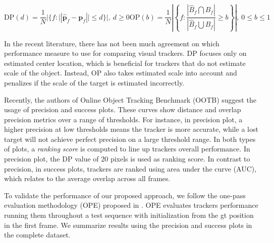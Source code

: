 \begin{subequations}
\begin{equation}
	\mathrm{DP}(d) = \frac{1}{N}|\{f:||\mathbf{\hat{p}}_f - \mathbf{p}_f|| \leq d\}|,\:d\geq 0
\label{eq::precision}
\end{equation}

\begin{equation}
	\mathrm{OP}(b) = \frac{1}{N}\left | \left \{ f: \frac{|\hat{B}_f \bigcap B_f|}
										{|\hat{B}_f \bigcup  B_f|}
	 \geq b \right \} \right |,\:0 \leq b\leq 1
\label{eq::overlap}
\end{equation}
\end{subequations}

In the recent literature, there has not been much agreement on which
performance measure to use for comparing visual trackers. DP focuses only
on estimated center location, which is beneficial for trackers that do not
estimate scale of the object. Instead, OP also takes estimated scale into
account and penalizes if the scale of the target is estimated incorrectly.

Recently, the authors of Online Object Tracking Benchmark (OOTB) \cite{Wu2013B} suggest the usage
of precision and success plots. These curves show distance and \gls{overlap} precision metrics over a range of
thresholds. For instance, in precision plot, a higher precision at low
thresholds means the tracker is more accurate, while a lost target will not
achieve perfect precision on a large threshold range. In both types of plots,
a \textit{ranking score} is computed to line up trackers overall performance.
In precision plot, the DP value of 20 pixels is used as ranking score. In contrast to precision, in success plots, trackers are ranked using area under
the curve (AUC), which relates to the average overlap across all frames. 

To validate the performance of our proposed approach, we follow the one-pass
evaluation methodology (OPE) proposed in \cite{Wu2013B}. OPE evaluates trackers
performance running them throughout a test sequence with initialization from
the \gls{gt} position in the first frame. We summarize results using the precision and
success plots in the complete dataset.

